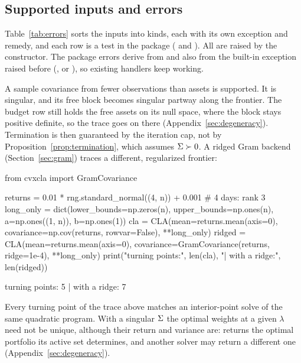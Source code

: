\subsection{Supported inputs and errors}
\label{sec:errors}




Table~\ref{tab:errors} sorts the inputs into kinds, each with its own exception and
remedy, and each row is a test in the package
( and
). All are raised by the constructor. The package errors derive from  and also from the built-in
exception raised before (, or ), so existing
handlers keep working.



A sample covariance from fewer observations than assets is supported. It is singular, and its free block becomes singular partway
along the frontier. The budget row still holds the free assets on its null space, where
the block stays positive definite, so the trace goes on there (Appendix~\ref{sec:degeneracy}).
Termination is then guaranteed by the iteration cap, not by
Proposition~\ref{prop:termination}, which assumes $\Sigma \succ 0$.
A ridged Gram backend (Section~\ref{sec:gram}) traces a different, regularized frontier:

\noindent\begin{minipage}{\textwidth}
\begin{CodeChunk}
\begin{CodeInput}
from cvxcla import GramCovariance

returns = 0.01 * rng.standard_normal((4, n)) + 0.001  # 4 days: rank 3
long_only = dict(lower_bounds=np.zeros(n), upper_bounds=np.ones(n),
                 a=np.ones((1, n)), b=np.ones(1))
cla = CLA(mean=returns.mean(axis=0),
          covariance=np.cov(returns, rowvar=False), **long_only)
ridged = CLA(mean=returns.mean(axis=0),
             covariance=GramCovariance(returns, ridge=1e-4), **long_only)
print("turning points:", len(cla), "| with a ridge:", len(ridged))
\end{CodeInput}
\begin{CodeOutput}
turning points: 5 | with a ridge: 7
\end{CodeOutput}
\end{CodeChunk}
\end{minipage}

Every turning point of the trace above matches an interior-point solve of the same
quadratic program. With a singular $\Sigma$ the optimal weights at a given $\lambda$ need
not be unique, although their return and variance are:  returns the optimal
portfolio its active set determines, and another solver may return a different one
(Appendix~\ref{sec:degeneracy}).

